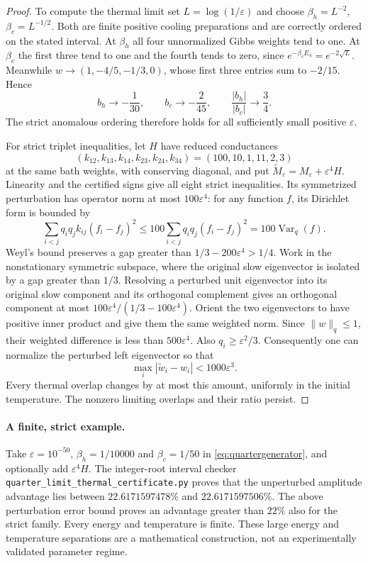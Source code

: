 \documentclass[11pt]{article}
\begin{document}
\begin{proof}
To compute the thermal limit set $L=\log(1/\varepsilon)$ and choose
$\beta_h=L^{-2}$, $\beta_c=L^{-1/2}$. Both are finite positive cooling
preparations and are correctly ordered on the stated interval. At $\beta_h$
all four unnormalized Gibbs weights tend to one. At $\beta_c$ the first
three tend to one and the fourth tends to zero, since
$e^{-\beta_c E_4}=e^{-2\sqrt L}$. Meanwhile
$w\to(1,-4/5,-1/3,0)$, whose first three entries sum to $-2/15$. Hence
\[
b_h\longrightarrow-\frac1{30},\qquad
b_c\longrightarrow-\frac2{45},\qquad
\frac{|b_h|}{|b_c|}\longrightarrow\frac34.
\]
The strict anomalous ordering therefore holds for all sufficiently small
positive $\varepsilon$.

For strict triplet inequalities, let $H$ have reduced conductances
\[
(k_{12},k_{13},k_{14},k_{23},k_{24},k_{34})=(100,10,1,11,2,3)
\]
at the same bath weights, with conserving diagonal, and put
$\widetilde M_\varepsilon=M_\varepsilon+\varepsilon^4H$.
Linearity and the certified signs give all eight strict inequalities.
Its symmetrized perturbation has operator norm at most $100\varepsilon^4$:
for any function $f$, its Dirichlet form is bounded by
\[
\sum_{i<j}q_iq_jk_{ij}(f_i-f_j)^2
\leq100\sum_{i<j}q_iq_j(f_i-f_j)^2
=100\operatorname{Var}_q(f).
\]
Weyl's bound preserves a gap greater than
$1/3-200\varepsilon^4>1/4$. Work in the nonstationary symmetric subspace,
where the original slow eigenvector is isolated by a gap greater than $1/3$.
Resolving a perturbed unit eigenvector into its original slow component and
its orthogonal complement gives an orthogonal component at most
$100\varepsilon^4/(1/3-100\varepsilon^4)$.
Orient the two eigenvectors to have positive inner product and give them
the same weighted norm. Since $\|w\|_q\leq1$, their weighted difference
is less than $500\varepsilon^4$. Also $q_i\geq\varepsilon^2/3$.
Consequently one can normalize the perturbed left eigenvector so that
\[
\max_i|\widetilde w_i-w_i|<1000\varepsilon^3.
\]
Every thermal overlap changes by at most this amount, uniformly in the
initial temperature. The nonzero limiting overlaps and their ratio persist.
\end{proof}

\paragraph{A finite, strict example.}
Take $\varepsilon=10^{-50}$, $\beta_h=1/10000$ and $\beta_c=1/50$ in
\eqref{eq:quartergenerator}, and optionally add $\varepsilon^4H$.
The integer-root interval checker
\texttt{quarter\_limit\_thermal\_certificate.py} proves that the unperturbed
amplitude advantage lies between $22.6171597478\%$ and $22.6171597506\%$.
The above perturbation error bound proves an advantage greater than $22\%$
also for the strict family. Every energy and temperature is finite. These
large energy and temperature separations are a mathematical construction,
not an experimentally validated parameter regime.
\end{document}
